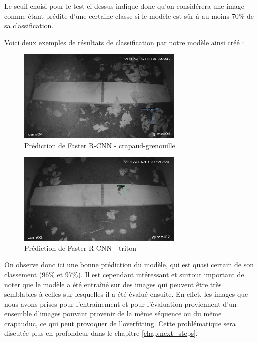Le seuil choisi pour le test ci-dessus indique donc qu'on considérera une image comme étant prédite d'une certaine classe si le modèle est sûr à au moins 70\% de sa classification.\newline

Voici deux exemples de résultats de classification par notre modèle ainsi créé :

\begin{figure}[H]
    \centering
    \includegraphics[width=300px]{images/Eval_FasterRCNN_crapGren.png}
    \caption{Prédiction de Faster R-CNN - crapaud-grenouille}
    \label{fig:fasterRcnn_crapGren}
\end{figure}

\begin{figure}[H]
    \centering
    \includegraphics[width=300px]{images/Eval_FasterRCNN_triton.png}
    \caption{Prédiction de Faster R-CNN - triton}
    \label{fig:fasterRcnn_triton}
\end{figure}

On observe donc ici une bonne prédiction du modèle, qui est quasi certain de son classement (96\% et 97\%). Il est cependant intéressant et surtout important de noter que le modèle a été entraîné sur des images qui peuvent être très semblables à celles sur lesquelles il a été évalué ensuite. En effet, les images que nous avons prises pour l'entraînement et pour l'évaluation proviennent d'un ensemble d'images pouvant provenir de la même séquence ou du même crapauduc, ce qui peut provoquer de l'overfitting. Cette problématique sera discutée plus en profondeur dans le chapitre \ref{chap:next_steps}.

